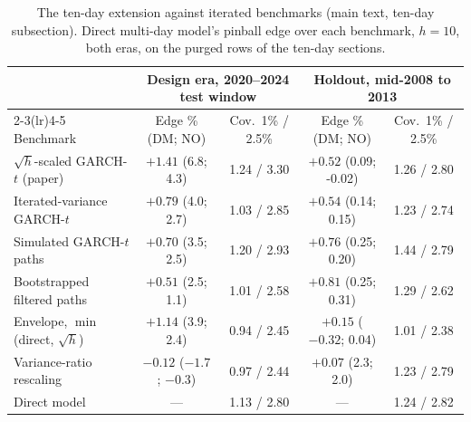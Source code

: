 \documentclass[11pt]{article}
\begin{document}
\begin{table}[htbp]
\centering
\begin{threeparttable}
\caption{The ten-day extension against iterated benchmarks (main text, ten-day subsection). Direct multi-day model's pinball edge over each benchmark, $h=10$, both eras, on the purged rows of the ten-day sections.}
\label{tab:tenday}
\scriptsize\setlength{\tabcolsep}{3pt}
\begin{tabular}{lcccc}
\toprule
& \multicolumn{2}{c}{Design era, 2020--2024 test window} & \multicolumn{2}{c}{Holdout, mid-2008 to 2013} \\
\cmidrule(lr){2-3}\cmidrule(lr){4-5}
Benchmark & Edge \% (DM; NO) & Cov.\ 1\% / 2.5\% & Edge \% (DM; NO) & Cov.\ 1\% / 2.5\% \\
\midrule
$\sqrt{h}$-scaled GARCH-$t$ (paper) & $+1.41$ (6.8; 4.3) & 1.24 / 3.30 & $+0.52$ (0.09; -0.02) & 1.26 / 2.80 \\
Iterated-variance GARCH-$t$ & $+0.79$ (4.0; 2.7) & 1.03 / 2.85 & $+0.54$ (0.14; 0.15) & 1.23 / 2.74 \\
Simulated GARCH-$t$ paths & $+0.70$ (3.5; 2.5) & 1.20 / 2.93 & $+0.76$ (0.25; 0.20) & 1.44 / 2.79 \\
Bootstrapped filtered paths & $+0.51$ (2.5; 1.1) & 1.01 / 2.58 & $+0.81$ (0.25; 0.31) & 1.29 / 2.62 \\
Envelope, $\min$(direct, $\sqrt{h}$) & $+1.14$ (3.9; 2.4) & 0.94 / 2.45 & $+0.15$ ($-0.32$; 0.04) & 1.01 / 2.38 \\
Variance-ratio rescaling & $-0.12$ ($-1.7$; $-0.3$) & 0.97 / 2.44 & $+0.07$ (2.3; 2.0) & 1.23 / 2.79 \\
Direct model & --- & 1.13 / 2.80 & --- & 1.24 / 2.82 \\
\bottomrule
\end{tabular}
\begin{tablenotes}\footnotesize

\end{tablenotes}
\end{threeparttable}
\end{table}
\end{document}
